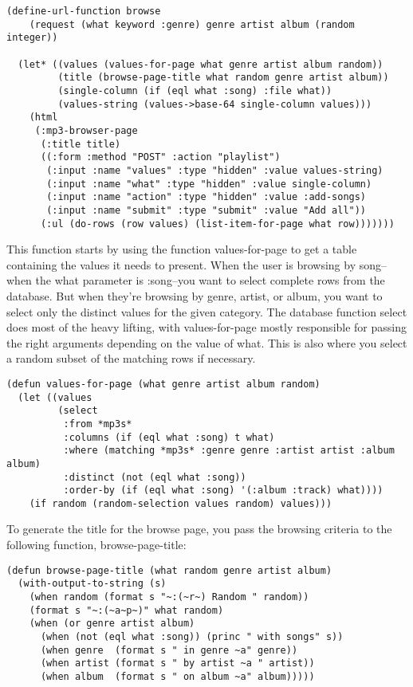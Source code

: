 \begin{lstlisting}
(define-url-function browse
    (request (what keyword :genre) genre artist album (random integer))

  (let* ((values (values-for-page what genre artist album random))
         (title (browse-page-title what random genre artist album))
         (single-column (if (eql what :song) :file what))
         (values-string (values->base-64 single-column values)))
    (html
     (:mp3-browser-page
      (:title title)
      ((:form :method "POST" :action "playlist")
       (:input :name "values" :type "hidden" :value values-string)
       (:input :name "what" :type "hidden" :value single-column)
       (:input :name "action" :type "hidden" :value :add-songs)
       (:input :name "submit" :type "submit" :value "Add all"))
      (:ul (do-rows (row values) (list-item-for-page what row)))))))
\end{lstlisting}

This function starts by using the function values-for-page to get a table containing the
values it needs to present. When the user is browsing by song--when the what parameter is
:song--you want to select complete rows from the database. But when they're browsing by
genre, artist, or album, you want to select only the distinct values for the given
category. The database function select does most of the heavy lifting, with
values-for-page mostly responsible for passing the right arguments depending on the value
of what. This is also where you select a random subset of the matching rows if necessary.

\begin{lstlisting}
(defun values-for-page (what genre artist album random)
  (let ((values
         (select 
          :from *mp3s*
          :columns (if (eql what :song) t what)
          :where (matching *mp3s* :genre genre :artist artist :album album)
          :distinct (not (eql what :song))
          :order-by (if (eql what :song) '(:album :track) what))))
    (if random (random-selection values random) values)))
\end{lstlisting}

To generate the title for the browse page, you pass the browsing criteria to the following
function, browse-page-title:

\begin{lstlisting}
(defun browse-page-title (what random genre artist album)
  (with-output-to-string (s)
    (when random (format s "~:(~r~) Random " random))
    (format s "~:(~a~p~)" what random)
    (when (or genre artist album)
      (when (not (eql what :song)) (princ " with songs" s))
      (when genre  (format s " in genre ~a" genre))
      (when artist (format s " by artist ~a " artist))
      (when album  (format s " on album ~a" album)))))
\end{lstlisting}


